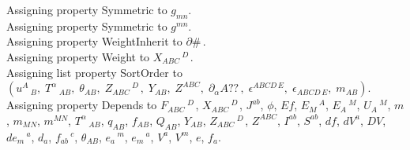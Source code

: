 \documentclass[11pt]{article}
\begin{document}
Assigning property Symmetric to ${g}_{m n}$.
\\
Assigning property Symmetric to ${g}^{m n}$.
\\
Assigning property WeightInherit to $\partial{\#}\, $.
\\
Assigning property Weight to ${X}_{A B C}\,^{D\, }$.
\\
Assigning list property SortOrder to $({u}^{A}\,_{B},\; {T}^{\alpha}\,_{A B},\; {\theta}_{A B},\; {Z}_{A B C}\,^{D\, },\; {Y}_{A B},\; {Z}^{A B C},\; {\partial}_{\alpha}{A??}\, ,\; {\epsilon}^{A B C D\,  E},\; {\epsilon}_{A B C D\,  E},\; {m}_{A B})$.
\\
Assigning property Depends to ${F}_{A B C}\,^{D\, }$, ${X}_{A B C}\,^{D\, }$, ${J}^{a b}$, $\phi$, $Ef$, ${E}_{M}\,^{A}$, ${E}_{A}\,^{M}$, ${U}_{A}\,^{M}$, $m$, ${m}_{M N}$, ${m}^{M N}$, ${T}^{\alpha}\,_{A B}$, ${q}_{A B}$, ${f}_{A B}$, ${Q}_{A B}$, ${Y}_{A B}$, ${Z}_{A B C}\,^{D\, }$, ${Z}^{A B C}$, ${I}^{a b}$, ${S}^{a b}$, $df$, ${dV}^{a}$, $DV$, ${de}_{m}\,^{a}$, ${d}_{a}$, ${f}_{a b}\,^{c}$, ${\theta}_{A B}$, ${e}_{a}\,^{m}$, ${e}_{m}\,^{a}$, ${V}^{a}$, ${V}^{m}$, $e$, ${f}_{a}$.
\\
\end{document}

